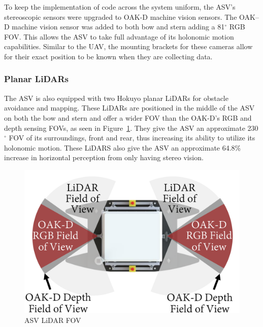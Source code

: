 \documentclass[letterpaper, 12 pt, conference]{ieeeconf}
\begin{document}
To keep the implementation of code across the system uniform, the ASV's stereoscopic sensors were upgraded to OAK-D machine vision sensors. The OAK--D machine vision sensor was added to both bow and stern adding a 81$^{\circ}$ RGB FOV. This allows the ASV to take full advantage of its holonomic motion capabilities. Similar to the UAV, the mounting brackets for these cameras allow for their exact position to be known when they are collecting data.
\subsubsection{Planar LiDARs}
The ASV is also equipped with two Hokuyo planar LiDARs for obstacle avoidance and mapping. These LiDARs are positioned in the middle of the ASV on both the bow and stern and offer a wider FOV than the OAK-D's RGB and depth sensing FOVs, as seen in Figure~\ref{fig:ASVLiDAR}. They give the ASV an approximate 230$^{\circ}$ FOV of its surroundings, front and rear, thus increasing its ability to utilize its holonomic motion. These LiDARS also give the ASV an approximate 64.8\% increase in horizontal perception from only having stereo vision.
%
\begin{figure}[tb]
\centering
\includegraphics[width=\columnwidth]{TDR/Figures/ASV_fieldOfView_gray_v4_Adobe Devanagari.pdf}
\caption{ASV LiDAR FOV}
\label{fig:ASVLiDAR}
\end{figure}
%
\end{document}
